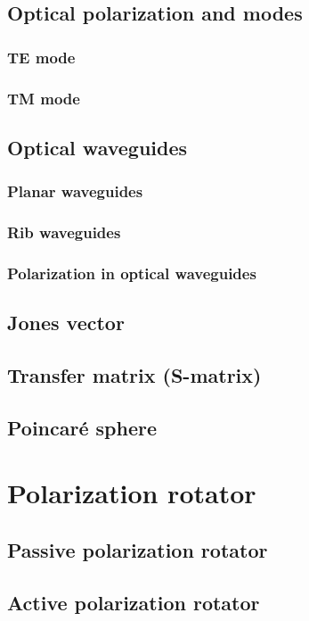 \documentclass[../report.tex]{subfiles}
\begin{document}
		\subsection{Optical polarization and modes}
			
			\subsubsection{TE mode}
						
			\subsubsection{TM mode}
			
		\subsection{Optical waveguides}
			
			\subsubsection{Planar waveguides}
			
			\subsubsection{Rib waveguides}
			
			\subsubsection{Polarization in optical waveguides}	
		
		\subsection{Jones vector}
		
		\subsection{Transfer matrix (S-matrix)}
		
		\subsection{Poincaré sphere}
			
	\section{Polarization rotator}
	
		\subsection{Passive polarization rotator}
	
		\subsection{Active polarization rotator}
\end{document}

